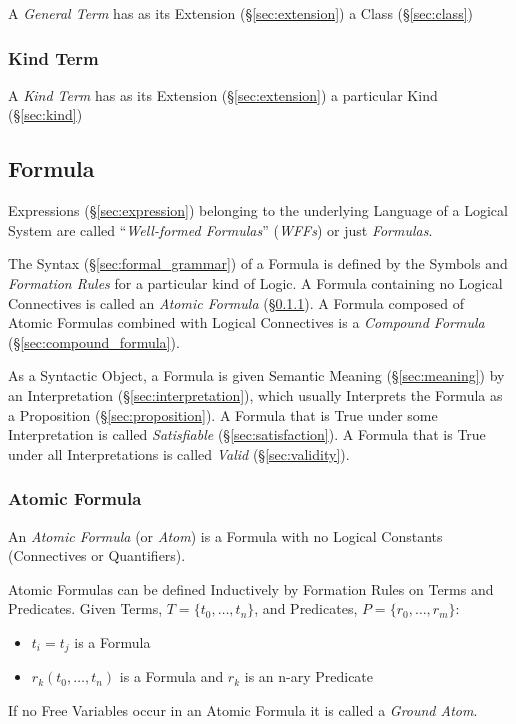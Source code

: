 A \emph{General Term} has as its Extension (\S\ref{sec:extension}) a
Class (\S\ref{sec:class})



\subsubsection{Kind Term}\label{sec:kind_term}
\cite{chalmers02}

A \emph{Kind Term} has as its Extension (\S\ref{sec:extension}) a
particular Kind (\S\ref{sec:kind})




\subsection{Formula}\label{sec:formula}

Expressions (\S\ref{sec:expression}) belonging to the underlying
Language of a Logical System are called ``\emph{Well-formed
  Formulas}'' (\emph{WFFs}) or just \emph{Formulas}.

The Syntax (\S\ref{sec:formal_grammar}) of a Formula is defined by the
Symbols and \emph{Formation Rules} for a particular kind of Logic. A
Formula containing no Logical Connectives is called an \emph{Atomic
  Formula} (\S\ref{sec:atomic_formula}). A Formula composed of Atomic
Formulas combined with Logical Connectives is a \emph{Compound
  Formula} (\S\ref{sec:compound_formula}).

As a Syntactic Object, a Formula is given Semantic Meaning
(\S\ref{sec:meaning}) by an Interpretation
(\S\ref{sec:interpretation}), which usually Interprets the Formula as
a Proposition (\S\ref{sec:proposition}). A Formula that is True under
some Interpretation is called \emph{Satisfiable}
(\S\ref{sec:satisfaction}). A Formula that is True under all
Interpretations is called \emph{Valid} (\S\ref{sec:validity}).



\subsubsection{Atomic Formula}\label{sec:atomic_formula}

An \emph{Atomic Formula} (or \emph{Atom}) is a Formula with no Logical
Constants (Connectives or Quantifiers).

Atomic Formulas can be defined Inductively by Formation Rules on Terms
and Predicates. Given Terms, $T = \{t_0,\ldots,t_n\}$, and Predicates,
$P = \{r_0,\ldots,r_m\}$:
\begin{itemize}
  \item $t_i = t_j$ is a Formula
  \item $r_k(t_0,\ldots,t_n)$ is a Formula and $r_k$ is an n-ary
    Predicate
\end{itemize}
If no Free Variables occur in an Atomic Formula it is called a
\emph{Ground Atom}.



